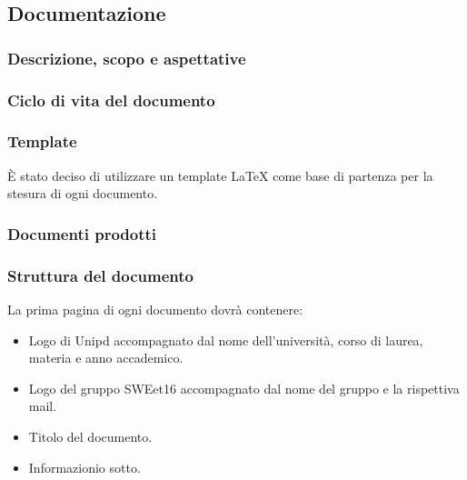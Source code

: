 \subsection{Documentazione}

\subsubsection{Descrizione, scopo e aspettative}

\subsubsection{Ciclo di vita del documento}

\subsubsection{Template}
È stato deciso di utilizzare un template LaTeX %
come base di partenza per la stesura di ogni documento.

\subsubsection{Documenti prodotti}




\subsubsection{Struttura del documento}

        La prima pagina di ogni documento dovrà contenere:
        \begin{itemize}
          \item Logo di Unipd accompagnato dal nome dell'università, corso di laurea, materia e anno accademico.
          \item Logo del gruppo SWEet16 accompagnato dal nome del gruppo e la rispettiva mail.
          \item Titolo del documento.
          \item Informazionio sotto. %
        \end{itemize}



